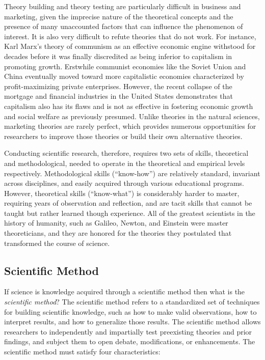 \documentclass[]{book}
\theoremstyle{definition}
\theoremstyle{definition}
\theoremstyle{definition}
\theoremstyle{remark}
\begin{document}
Theory building and theory testing are particularly difficult in
business and marketing, given the imprecise nature of the theoretical
concepts and the presence of many unaccounted factors that can influence
the phenomenon of interest. It is also very difficult to refute theories
that do not work. For instance, Karl Marx's theory of communism as an
effective economic engine withstood for decades before it was finally
discredited as being inferior to capitalism in promoting growth.
Erstwhile communist economies like the Soviet Union and China eventually
moved toward more capitalistic economies characterized by
profit-maximizing private enterprises. However, the recent collapse of
the mortgage and financial industries in the United States demonstrates
that capitalism also has its flaws and is not as effective in fostering
economic growth and social welfare as previously presumed. Unlike
theories in the natural sciences, marketing theories are rarely perfect,
which provides numerous opportunities for researchers to improve those
theories or build their own alternative theories.

Conducting scientific research, therefore, requires two sets of skills,
theoretical and methodological, needed to operate in the theoretical and
empirical levels respectively. Methodological skills (``know-how'') are
relatively standard, invariant across disciplines, and easily acquired
through various educational programs. However, theoretical skills
(``know-what'') is considerably harder to master, requiring years of
observation and reflection, and are tacit skills that cannot be taught
but rather learned though experience. All of the greatest scientists in
the history of humanity, such as Galileo, Newton, and Einstein were
master theoreticians, and they are honored for the theories they
postulated that transformed the course of science.

\hypertarget{scientific-method}{%
\subsection{Scientific Method}\label{scientific-method}}

If science is knowledge acquired through a scientific method then what
is the \emph{scientific method}? The scientific method refers to a
standardized set of techniques for building scientific knowledge, such
as how to make valid observations, how to interpret results, and how to
generalize those results. The scientific method allows researchers to
independently and impartially test preexisting theories and prior
findings, and subject them to open debate, modifications, or
enhancements. The scientific method must satisfy four characteristics:
\end{document}
